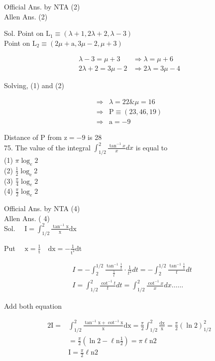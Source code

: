\documentclass[10pt]{article}
\begin{document}
Official Ans. by NTA (2)\\
Allen Ans. (2)

Sol. Point on \(\mathrm{L}_{1} \equiv(\lambda+1,2 \lambda+2, \lambda-3)\)\\
Point on \(\mathrm{L}_{2} \equiv(2 \mu+\mathrm{a}, 3 \mu-2, \mu+3)\)

\[
\begin{array}{ll}
\lambda-3=\mu+3 & \Rightarrow \lambda=\mu+6 \\
2 \lambda+2=3 \mu-2 & \Rightarrow 2 \lambda=3 \mu-4
\end{array}
\]

Solving, (1) and (2)

\[
\begin{array}{ll}
\Rightarrow & \lambda=22 \& \mu=16 \\
\Rightarrow & \mathrm{P} \equiv(23,46,19) \\
\Rightarrow & \mathrm{a}=-9
\end{array}
\]

Distance of P from \(\mathrm{z}=-9\) is 28\\
75. The value of the integral \(\int_{1 / 2}^{2} \frac{\tan ^{-1} x}{x} d x\) is equal to\\
(1) \(\pi \log _{e} 2\)\\
(2) \(\frac{1}{2} \log _{\mathrm{e}} 2\)\\
(3) \(\frac{\pi}{4} \log _{e} 2\)\\
(4) \(\frac{\pi}{2} \log _{e} 2\)

Official Ans. by NTA (4)\\
Allen Ans. ( 4)\\
Sol. \(\quad \mathrm{I}=\int_{1 / 2}^{2} \frac{\tan ^{-1} \mathrm{x}}{\mathrm{x}} \mathrm{dx}\)

Put \(\quad \mathrm{x}=\frac{1}{\mathrm{t}} \quad \mathrm{dx}=-\frac{1}{\mathrm{t}^{2}} \mathrm{dt}\)

\[
\begin{aligned}
& I=-\int_{2}^{1 / 2} \frac{\tan ^{-1} \frac{1}{t}}{\frac{1}{t}} \cdot \frac{1}{t^{2}} d t=-\int_{2}^{1 / 2} \frac{\tan ^{-1} \frac{1}{t}}{t} d t \\
& I=\int_{1 / 2}^{2} \frac{\cot ^{-1} t}{t} d t=\int_{1 / 2}^{2} \frac{\cot ^{-1} x}{x} d x \ldots \ldots
\end{aligned}
\]

Add both equation

\[
\begin{aligned}
2 \mathrm{I}= & \int_{1 / 2}^{2} \frac{\tan ^{-1} \mathrm{x}+\cot ^{-1} \mathrm{x}}{\mathrm{x}} \mathrm{dx}=\frac{\pi}{2} \int_{1 / 2}^{2} \frac{\mathrm{dx}}{\mathrm{x}}=\frac{\pi}{2}(\ln 2)_{1 / 2}^{2} \\
& =\frac{\pi}{2}\left(\ln 2-\ell \mathrm{n} \frac{1}{2}\right)=\pi \ell \mathrm{n} 2 \\
& \mathrm{I}=\frac{\pi}{2} \ell \mathrm{n} 2
\end{aligned}
\]
\end{document}
